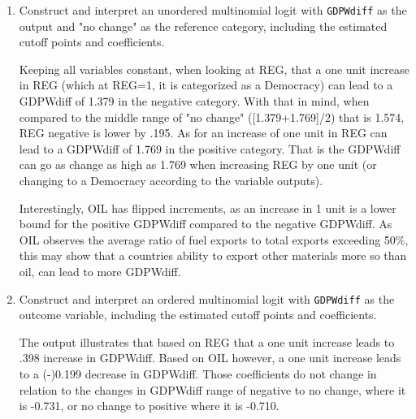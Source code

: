 \documentclass[12pt,letterpaper]{article}
\begin{document}
\begin{enumerate}
	\item Construct and interpret an unordered multinomial logit with \texttt{GDPWdiff} as the output and "no change" as the reference category, including the estimated cutoff points and coefficients.
	
	\vspace{.5cm}
	  
	\vspace{.5cm}
	
Keeping all variables constant, when looking at REG, that a one unit increase in REG (which at REG=1, it is categorized as a Democracy) can lead to a GDPWdiff of 1.379 in the negative category. With that in mind, when compared to the middle range of "no change" ([1.379+1.769]/2) that is 1.574, REG negative is lower by .195. As for an increase of one unit in REG can lead to a GDPWdiff of 1.769 in the positive category. That is the GDPWdiff can go as change as high as 1.769 when increasing REG by one unit (or changing to a Democracy according to the variable outputs). 

Interestingly, OIL has flipped increments, as an increase in 1 unit is a lower bound for the positive GDPWdiff compared to the negative GDPWdiff. As OIL observes the average ratio of fuel exports to total exports exceeding 50\%, this may show that a countries ability to export other materials more so than oil, can lead to more GDPWdiff.

	\item Construct and interpret an ordered multinomial logit with \texttt{GDPWdiff} as the outcome variable, including the estimated cutoff points and coefficients.
	
	\vspace{.5cm}
	  
	\vspace{.5cm}
	
The output illustrates that based on REG that a one unit increase leads to .398 increase in GDPWdiff. Based on OIL however, a one unit increase leads to a (-)0.199 decrease in GDPWdiff. Those coefficients do not change in relation to the changes in GDPWdiff range of negative to no change, where it is -0.731, or no change to positive where it is -0.710.  	
\end{enumerate}
\end{document}
